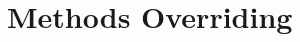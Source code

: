 \documentclass{KodeBook}
\begin{document}
\section{Methods Overriding}



%
%
%
%
%
%
%
%
%
%
%
%
%
%
%
%
%
%
%
%
%
%
%
%
%
%
%
%
%
%
%
%
%
\end{document}
